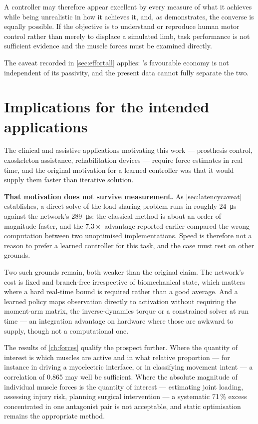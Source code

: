 A controller may therefore appear excellent by every measure of what it achieves
while being unrealistic in how it achieves it, and, as \PPO demonstrates, the
converse is equally possible. If the objective is to understand or reproduce
human motor control rather than merely to displace a simulated limb, task
performance is not sufficient evidence and the muscle forces must be examined
directly.

The caveat recorded in \cref{sec:effortall} applies: \PPO's favourable economy is
not independent of its passivity, and the present data cannot fully separate the
two.

\section{Implications for the intended applications}

The clinical and assistive applications motivating this work --- prosthesis
control, exoskeleton assistance, rehabilitation devices --- require force
estimates in real time, and the original motivation for a learned controller was
that it would supply them faster than iterative solution.

\textbf{That motivation does not survive measurement.} As
\cref{sec:latencycaveat} establishes, a direct solve of the load-sharing problem
runs in roughly \SI{24}{\micro\second} against the network's
\SI{289}{\micro\second}: the classical method is about an order of magnitude
faster, and the $7.3\times$ advantage reported earlier compared the wrong
computation between two unoptimised implementations. Speed is therefore not a
reason to prefer a learned controller for this task, and the case must rest on
other grounds.

Two such grounds remain, both weaker than the original claim. The network's cost
is fixed and branch-free irrespective of biomechanical state, which matters where
a hard real-time bound is required rather than a good average. And a learned
policy maps observation directly to activation without requiring the moment-arm
matrix, the inverse-dynamics torque or a constrained solver at run time --- an
integration advantage on hardware where those are awkward to supply, though not a
computational one.

The results of \cref{ch:forces} qualify the prospect further. Where the quantity
of interest is which muscles are active and in what relative proportion --- for
instance in driving a myoelectric interface, or in classifying movement intent
--- a correlation of 0.865 may well be sufficient.
Where the absolute magnitude of individual muscle forces is the quantity of
interest --- estimating joint loading, assessing injury risk, planning surgical
intervention --- a systematic 71\,\% excess concentrated in one antagonist pair
is not acceptable, and static optimisation remains the appropriate method.


